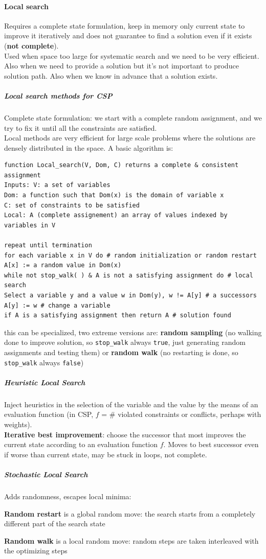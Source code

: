 \documentclass[10pt]{report}
\begin{document}
\paragraph{Local search} Requires a complete state formulation, keep in memory only current state to improve it iteratively and does not guarantee to find a solution even if it exists (\textbf{not complete}).\\
Used when space too large for systematic search and we need to be very efficient. Also when we need to provide a solution but it's not important to produce solution path. Also when we know in advance that a solution exists.
\subparagraph{Local search methods for CSP} Complete state formulation: we start with a complete random assignment, and we try to fix it until all the constraints are satisfied.\\
Local methods are very efficient for large scale problems where the solutions are densely distributed in the space. A basic algorithm is:
\begin{verbatim}
function Local_search(V, Dom, C) returns a complete & consistent assignment
Inputs: V: a set of variables
Dom: a function such that Dom(x) is the domain of variable x
C: set of constraints to be satisfied
Local: A (complete assignement) an array of values indexed by variables in V

repeat until termination
for each variable x in V do # random initialization or random restart
A[x] := a random value in Dom(x)
while not stop_walk( ) & A is not a satisfying assignment do # local search
Select a variable y and a value w in Dom(y), w != A[y] # a successors
A[y] := w # change a variable
if A is a satisfying assignment then return A # solution found
\end{verbatim}
this can be specialized, two extreme versions are: \textbf{random sampling} (no walking done to improve solution, so \texttt{stop\_walk} always \texttt{true}, just generating random assignments and testing them) or \textbf{random walk} (no restarting is done, so \texttt{stop\_walk} always \texttt{false})
\subparagraph{Heuristic Local Search} Inject heuristics in the selection of the variable and the value by the means of an evaluation function (in CSP, $f$ = \# violated constraints or conflicts, perhaps with weights).\\
\textbf{Iterative best improvement}: choose the successor that most improves the current state according to an evaluation function $f$. Moves to best successor even if worse than current state, may be stuck in loops, not complete.
\subparagraph{Stochastic Local Search} Adds randomness, escapes local minima:\begin{list}{}{}
	\item \textbf{Random restart} is a global random move: the search starts from a completely different part of the search state
	\item \textbf{Random walk} is a local random move: random steps are taken interleaved with the optimizing steps
\end{list}
\end{document}
